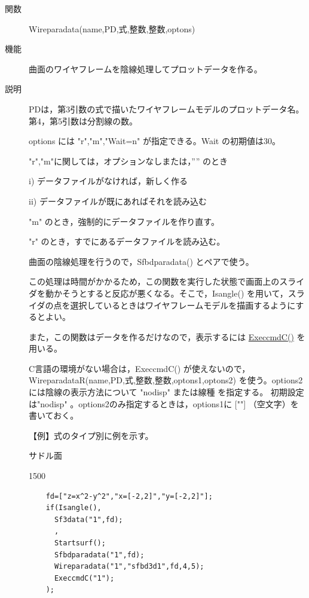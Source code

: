 \documentclass[papersize,a4paper,12pt,uplatex]{jsarticle}
\begin{document}
\begin{description}
\hypertarget{wireparadata}{}
\item[関数]  Wireparadata(name,PD,式,整数,整数,optons)
\item[機能]  曲面のワイヤフレームを陰線処理してプロットデータを作る。
\item[説明]  PDは，第3引数の式で描いたワイヤフレームモデルのプロットデータ名。第4，第5引数は分割線の数。

options には "r","m","Wait=n" が指定できる。Wait の初期値は30。

  "r","m"に関しては，オプションなしまたは，”” のとき
  
    i) データファイルがなければ，新しく作る
    
    ii) データファイルが既にあればそれを読み込む
    
  "m"  のとき，強制的にデータファイルを作り直す。
  
  "r" のとき，すでにあるデータファイルを読み込む。
  
曲面の陰線処理を行うので，Sfbdparadata() とペアで使う。

この処理は時間がかかるため，この関数を実行した状態で画面上のスライダを動かそうとすると反応が悪くなる。そこで，Isangle() を用いて，スライダの点を選択しているときはワイヤフレームモデルを描画するようにするとよい。

また，この関数はデータを作るだけなので，表示するには \hyperlink{execcmdc}{ExeccmdC()} を用いる。

C言語の環境がない場合は，ExeccmdC() が使えないので，WireparadataR(name,PD,式,整数,整数,optons1,optons2) を使う。options2には陰線の表示方法について "nodisp" または線種 を指定する。 初期設定は"nodisp" 。options2のみ指定するときは，options1に [""] （空文字）を書いておく。


\vspace{\baselineskip} 
【例】式のタイプ別に例を示す。

\vspace{\baselineskip}
サドル面

\begin{layer}{150}{0}
\end{layer}
\begin{verbatim}
    fd=["z=x^2-y^2","x=[-2,2]","y=[-2,2]"];
    if(Isangle(),
      Sf3data("1",fd);
      ,
      Startsurf();
      Sfbdparadata("1",fd);
      Wireparadata("1","sfbd3d1",fd,4,5);
      ExeccmdC("1");
    );
\end{verbatim}


\end{description}
\end{document}

